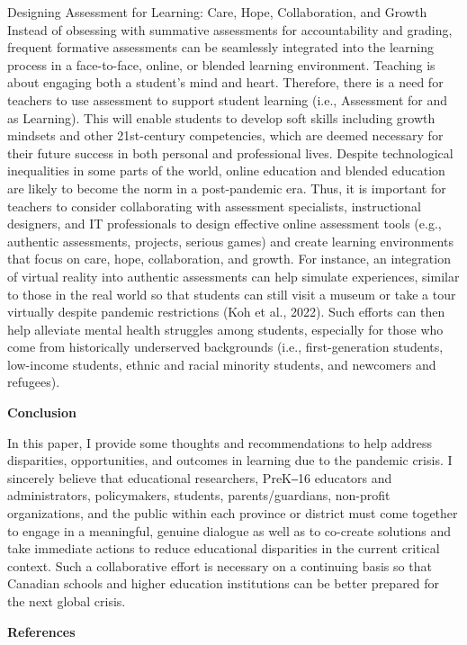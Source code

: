 \documentclass[
]{book}
\begin{document}
Designing Assessment for Learning: Care, Hope, Collaboration, and Growth
Instead of obsessing with summative assessments for accountability and grading, frequent formative assessments can be seamlessly integrated into the learning process in a face-to-face, online, or blended learning environment. Teaching is about engaging both a student's mind and heart. Therefore, there is a need for teachers to use assessment to support student learning (i.e., Assessment for and as Learning). This will enable students to develop soft skills including growth mindsets and other 21st-century competencies, which are deemed necessary for their future success in both personal and professional lives. Despite technological inequalities in some parts of the world, online education and blended education are likely to become the norm in a post-pandemic era. Thus, it is important for teachers to consider collaborating with assessment specialists, instructional designers, and IT professionals to design effective online assessment tools (e.g., authentic assessments, projects, serious games) and create learning environments that focus on care, hope, collaboration, and growth. For instance, an integration of virtual reality into authentic assessments can help simulate experiences, similar to those in the real world so that students can still visit a museum or take a tour virtually despite pandemic restrictions (Koh et al., 2022). Such efforts can then help alleviate mental health struggles among students, especially for those who come from historically underserved backgrounds (i.e., first-generation students, low-income students, ethnic and racial minority students, and newcomers and refugees).

\textbf{Conclusion}

In this paper, I provide some thoughts and recommendations to help address disparities, opportunities, and outcomes in learning due to the pandemic crisis. I sincerely believe that educational researchers, PreK‒16 educators and administrators, policymakers, students, parents/guardians, non-profit organizations, and the public within each province or district must come together to engage in a meaningful, genuine dialogue as well as to co-create solutions and take immediate actions to reduce educational disparities in the current critical context. Such a collaborative effort is necessary on a continuing basis so that Canadian schools and higher education institutions can be better prepared for the next global crisis.

\textbf{References}
\end{document}
